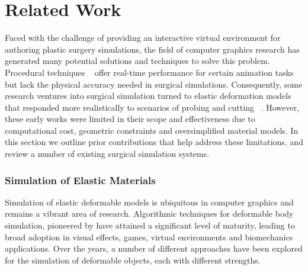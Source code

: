 


\chapter{Related Work}
\label{chp:relatedwork}

Faced with the challenge of providing an interactive virtual
environment for authoring plastic surgery simulations, the field of
computer graphics research has generated many potential solutions and
techniques to solve this problem. Procedural techniques
~\citep{JoshiMDGS:2007,WangP:2002,KavanCZO:2008,VaillBGCRWGP:2013} offer real-time
performance for certain animation tasks but lack the physical accuracy
needed in surgical simulations. Consequently, some research ventures
into surgical simulation turned to elastic deformation models
~\citep{TerzoPBF:1987} that responded more realistically to scenarios of
probing and cutting ~\citep{BroC:1996,MendoL:2003,NienhS:2001}. However,
these early works were limited in their scope and effectiveness due to
computational cost, geometric constraints and oversimplified material
models. In this section we outline prior contributions that help
address these limitations, and review a number of existing surgical
simulation systems.

\subsection{Simulation of Elastic Materials}

Simulation of elastic deformable models is ubiquitous in computer
graphics and remains a vibrant area of research. Algorithmic
techniques for deformable body simulation, pioneered by \citet{TerzoPBF:1987} have attained a significant level of
maturity, leading to broad adoption in visual effects, games, virtual
environments and biomechanics applications. Over the years, a number
of different approaches have been explored for the simulation of
deformable objects, each with different strengths. 

